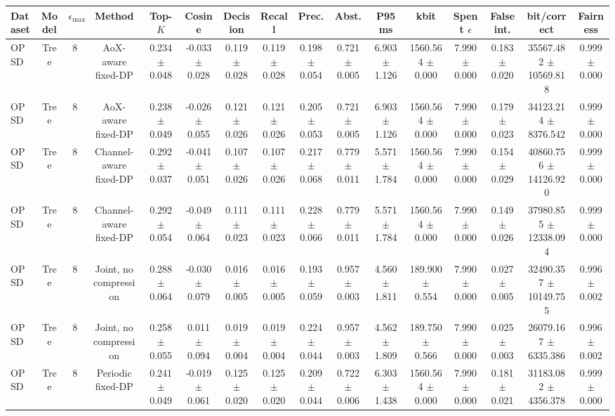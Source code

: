 \begin{tabular}{lccccccccccccccc}
\toprule
Dataset & Model & $\epsilon_{\max}$ & Method & Top-$K$ & Cosine & Decision & Recall & Prec. & Abst. & P95 ms & kbit & Spent $\epsilon$ & False int. & bit/correct & Fairness \\
\midrule
OPSD & Tree & 8 & AoX-aware fixed-DP & 0.234 $\pm$ 0.048 & -0.033 $\pm$ 0.028 & 0.119 $\pm$ 0.028 & 0.119 $\pm$ 0.028 & 0.198 $\pm$ 0.054 & 0.721 $\pm$ 0.005 & 6.903 $\pm$ 1.126 & 1560.564 $\pm$ 0.000 & 7.990 $\pm$ 0.000 & 0.183 $\pm$ 0.020 & 35567.482 $\pm$ 10569.818 & 0.999 $\pm$ 0.000 \\
OPSD & Tree & 8 & AoX-aware fixed-DP & 0.238 $\pm$ 0.049 & -0.026 $\pm$ 0.055 & 0.121 $\pm$ 0.026 & 0.121 $\pm$ 0.026 & 0.205 $\pm$ 0.053 & 0.721 $\pm$ 0.005 & 6.903 $\pm$ 1.126 & 1560.564 $\pm$ 0.000 & 7.990 $\pm$ 0.000 & 0.179 $\pm$ 0.023 & 34123.214 $\pm$ 8376.542 & 0.999 $\pm$ 0.000 \\
OPSD & Tree & 8 & Channel-aware fixed-DP & 0.292 $\pm$ 0.037 & -0.041 $\pm$ 0.051 & 0.107 $\pm$ 0.026 & 0.107 $\pm$ 0.026 & 0.217 $\pm$ 0.068 & 0.779 $\pm$ 0.011 & 5.571 $\pm$ 1.784 & 1560.564 $\pm$ 0.000 & 7.990 $\pm$ 0.000 & 0.154 $\pm$ 0.029 & 40860.756 $\pm$ 14126.920 & 0.999 $\pm$ 0.000 \\
OPSD & Tree & 8 & Channel-aware fixed-DP & 0.292 $\pm$ 0.054 & -0.049 $\pm$ 0.064 & 0.111 $\pm$ 0.023 & 0.111 $\pm$ 0.023 & 0.228 $\pm$ 0.066 & 0.779 $\pm$ 0.011 & 5.571 $\pm$ 1.784 & 1560.564 $\pm$ 0.000 & 7.990 $\pm$ 0.000 & 0.149 $\pm$ 0.026 & 37980.855 $\pm$ 12338.094 & 0.999 $\pm$ 0.000 \\
OPSD & Tree & 8 & Joint, no compression & 0.288 $\pm$ 0.064 & -0.030 $\pm$ 0.079 & 0.016 $\pm$ 0.005 & 0.016 $\pm$ 0.005 & 0.193 $\pm$ 0.059 & 0.957 $\pm$ 0.003 & 4.560 $\pm$ 1.811 & 189.900 $\pm$ 0.554 & 7.990 $\pm$ 0.000 & 0.027 $\pm$ 0.005 & 32490.357 $\pm$ 10149.755 & 0.996 $\pm$ 0.002 \\
OPSD & Tree & 8 & Joint, no compression & 0.258 $\pm$ 0.055 & 0.011 $\pm$ 0.094 & 0.019 $\pm$ 0.004 & 0.019 $\pm$ 0.004 & 0.224 $\pm$ 0.044 & 0.957 $\pm$ 0.003 & 4.562 $\pm$ 1.809 & 189.750 $\pm$ 0.566 & 7.990 $\pm$ 0.000 & 0.025 $\pm$ 0.003 & 26079.167 $\pm$ 6335.386 & 0.996 $\pm$ 0.002 \\
OPSD & Tree & 8 & Periodic fixed-DP & 0.241 $\pm$ 0.049 & -0.019 $\pm$ 0.061 & 0.125 $\pm$ 0.020 & 0.125 $\pm$ 0.020 & 0.209 $\pm$ 0.044 & 0.722 $\pm$ 0.006 & 6.303 $\pm$ 1.438 & 1560.564 $\pm$ 0.000 & 7.990 $\pm$ 0.000 & 0.181 $\pm$ 0.021 & 31183.082 $\pm$ 4356.378 & 0.999 $\pm$ 0.000 \\

\end{tabular}
